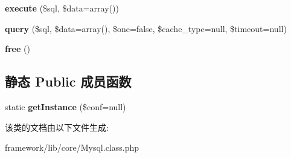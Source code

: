 \begin{DoxyCompactItemize}
\item 
\hypertarget{classMysql_a826fe8b981befb7a519d8c595c40d228}{{\bfseries execute} (\$sql, \$data=array())}\label{classMysql_a826fe8b981befb7a519d8c595c40d228}

\item 
\hypertarget{classMysql_a618c566fc1d8681b2fc97a2bd2cfe2ad}{{\bfseries query} (\$sql, \$data=array(), \$one=false, \$cache\+\_\+type=null, \$timeout=null)}\label{classMysql_a618c566fc1d8681b2fc97a2bd2cfe2ad}

\item 
\hypertarget{classMysql_afc7a03941758a18f6e84ed43e1338853}{{\bfseries free} ()}\label{classMysql_afc7a03941758a18f6e84ed43e1338853}

\end{DoxyCompactItemize}
\subsection*{静态 Public 成员函数}
\begin{DoxyCompactItemize}
\item 
\hypertarget{classMysql_af63ac3c1185428d124c09c67ff760d24}{static {\bfseries get\+Instance} (\$conf=null)}\label{classMysql_af63ac3c1185428d124c09c67ff760d24}

\end{DoxyCompactItemize}


该类的文档由以下文件生成\+:\begin{DoxyCompactItemize}
\item 
framework/lib/core/Mysql.\+class.\+php\end{DoxyCompactItemize}
